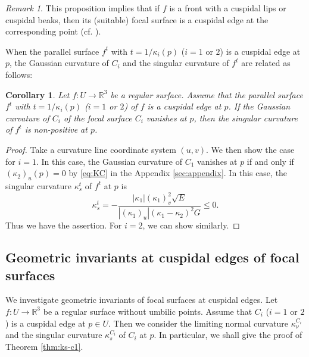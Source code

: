 \documentclass[11pt,a4paper,pdflatex,final]{amsart}
\theoremstyle{plain}
\newtheorem{corollary}[theorem]{Corollary}%
\theoremstyle{definition}
\theoremstyle{remark}
\newtheorem{rmk}[theorem]{Remark}%
\newcommand{\0}{\bm{0}}
\newcommand{\R}{\mathbb{R}}
\numberwithin{equation}{section}
\begin{document}
\begin{rmk}
This proposition implies that 
if $f$ is a front with a cuspidal lips or cuspidal beaks, 
then its (suitable) focal surface is a cuspidal edge 
at the corresponding point (cf. \cite{tera2}). 
\end{rmk}

When the parallel surface $f^t$ with $t=1/\kappa_i(p)$ ($i=1$ or $2$) is a cuspidal edge at $p$, 
the Gaussian curvature of $C_i$ and the singular curvature of $f^t$ are related as follows: 
\begin{corollary}
	Let $f\colon U\to\R^3$ be a regular surface. 
	Assume that the parallel surface $f^t$ with $t=1/\kappa_i(p)$ 
	\textup{(}$i=1$ or $2$\textup{)} of $f$ 
	is a cuspidal edge at $p$. 
	If the Gaussian curvature of $C_i$ of the focal surface $C_i$ vanishes at $p$, 
	then the singular curvature of $f^t$ is non-positive at $p$. 
\end{corollary}
\begin{proof}
	Take a curvature line coordinate system $(u,v)$. 
	We then show the case for $i=1$. 
	In this case, the Gaussian curvature of $C_1$ vanishes at $p$ 
	if and only if $(\kappa_2)_u(p)=0$ by \eqref{eq:KC} in the Appendix \ref{sec:appendix}. 
	In this case, the singular curvature $\kappa_s^t$ of $f^t$ at $p$ is 
	\[
	\kappa_s^t=-\frac{|\kappa_1|(\kappa_1)_v^2\sqrt{E}}{|(\kappa_1)_u|(\kappa_1-\kappa_2)^2G}\leq0.
	\]
	Thus we have the assertion. 
	For $i=2$, we can show similarly. 
\end{proof}

\subsection{Geometric invariants at cuspidal edges of focal surfaces}
We investigate geometric invariants of focal surfaces at cuspidal edges. 
{Let $f\colon U\to\R^3$ be a regular surface without umbilic points.
Assume that $C_i$ ($i=1$ or $2$) is a cuspidal edge at $p\in U$. 
Then we consider the limiting normal curvature $\kappa_\nu^{C_i}$ and 
the singular curvature $\kappa_s^{C_i}$ of $C_i$ at $p$. 
In particular, we shall give the proof of Theorem \ref{thm:ks-c1}.}
\end{document}
